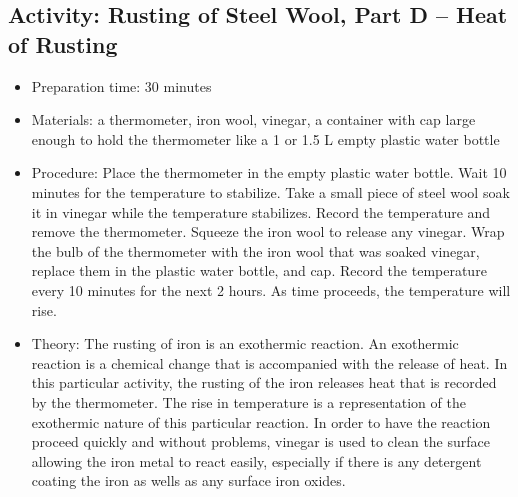 \begin{itemize}
{\subsection{Activity: Rusting of Steel Wool, Part D – Heat of Rusting}
\begin{itemize}
\item{Preparation time: 30 minutes}
\item{Materials: a thermometer, iron wool, vinegar, a container with cap large enough to hold the thermometer like a 1 or 1.5 L empty plastic water bottle}
\item{Procedure: Place the thermometer in the empty plastic water bottle. Wait 10 minutes for the temperature to stabilize. Take a small piece of steel wool soak it in vinegar while the temperature stabilizes. Record the temperature and remove the thermometer. Squeeze the iron wool to release any vinegar. Wrap the bulb of the thermometer with the iron wool that was soaked vinegar, replace them in the plastic water bottle, and cap. Record the temperature every 10 minutes for the next 2 hours. As time proceeds, the temperature will rise.}
\item{Theory: The rusting of iron is an exothermic reaction. An exothermic reaction is a chemical change that is accompanied with the release of heat. In this particular activity, the rusting of the iron releases heat that is recorded by the thermometer. The rise in temperature is a representation of the exothermic nature of this particular reaction. In order to have the reaction proceed quickly and without problems, vinegar is used to clean the surface allowing the iron metal to react easily, especially if there is any detergent coating the iron as wells as any surface iron oxides.}
\end{itemize}

}
\end{itemize}
